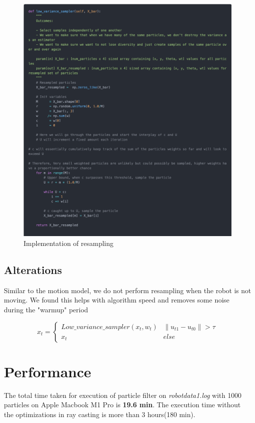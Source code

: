 \documentclass[12pt, a4paper]{article}
\begin{document}
\begin{figure}[!htb]
  \centering
  \includegraphics[width=0.9\linewidth]{results/resampling_2.png}
  \caption{Implementation of resampling}
\end{figure}
\subsection{Alterations}
Similar to the motion model, we do not perform resampling when the robot is not moving. We found this helps with algorithm speed and removes some noise during the "warmup" period

\[ 
x_{t} = \left\{
\begin{array}{ll}
    Low\_variance\_sampler(x_{t}, w_{t}) & \lVert u_{t1} - u_{t0} \rVert > \tau \\
    x_{t} & else
\end{array} 
\right. 
\]

\clearpage
\section{Performance}
The total time taken for execution of particle filter on \textit{robotdata1.log} with 1000 particles on Apple Macbook M1 Pro is \textbf{19.6 min}. The execution time without the optimizations in ray casting is more than 3 hours(180 min).
\end{document}

